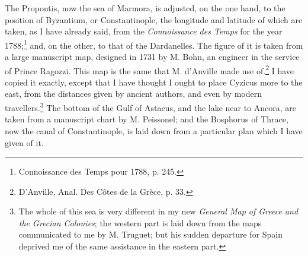 \documentclass[a4paper, 11pt, oneside, polutonikogreek, english]{article}
\begin{document}
The Propontis, now the sea of Marmora, is adjusted, on the one hand, to the position of Byzantium, or Constantinople, the longitude and latitude of which are taken, as I have already said, from the \emph{Connoissance des Temps} for the year 1788;\footnote{Connoissance des Temps pour 1788, p. 245.} and, on the other, to that of the Dardanelles. The figure of it is taken from a large manuscript map, designed in 1731 by M. Bohn, an engineer in the service of Prince Ragozzi. This map is the same that M. d'Anville made use of.\footnote{D'Anville, Anal. Des Côtes de la Grèce, p. 33.} I have copied it exactly, except that I have thought I ought to place Cyzicus more to the east, from the distances given by ancient authors, and even by modern travellers.\footnote{The whole of this sea is very different in my new \emph{General Map of Greece and the Grecian Colonies}; the western part is laid down from the maps communicated to me by M. Truguet; but his sudden departure for Spain deprived me of the same assistance in the eastern part.} The bottom of the Gulf of Astacus, and the lake near to Ancora, are taken from a manuscript chart by M. Peissonel; and the Bosphorus of Thrace, now the canal of Constantinople, is laid down from a particular plan which I have given of it.
\end{document}
